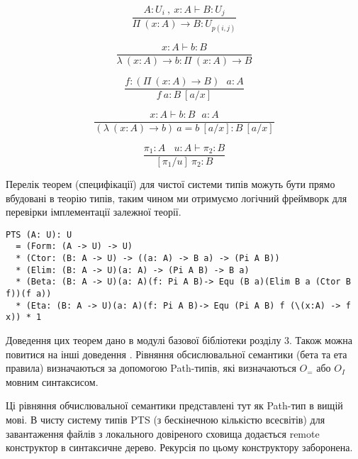 \begin{equation}
\tag{$\Pi$-formation}
\dfrac
{A:U_i\ ,\ x:A \vdash B : U_j}
{\Pi\ (x:A) \rightarrow B : U_{p(i,j)}}
\end{equation}

\begin{equation}
\tag{$\lambda$-intro}
\dfrac
{x:A \vdash b : B}
{\lambda\ (x:A) \rightarrow b : \Pi\ (x: A) \rightarrow B }
\end{equation}

\begin{equation}
\tag{$App$-elimination}
\dfrac
{f: (\Pi\ (x:A) \rightarrow B)\ \ \ a: A}
{f\ a : B\ [a/x]}
\end{equation}

\begin{equation}
\tag{$\beta$-computation}
\dfrac
{x:A \vdash b: B\ \ \ a:A}
{(\lambda\ (x:A) \rightarrow b)\ a = b\ [a/x] : B\ [a/x]}
\end{equation}

\begin{equation}
\tag{subst}
\dfrac
{\pi_1 : A\ \ \ \ u:A \vdash \pi_2 : B}
{[\pi_1/u]\ \pi_2 : B}
\end{equation}

Перелік теорем (специфікації) для чистої системи типів можуть бути
прямо вбудовані в теорію типів, таким чином ми отримуємо логічний фреймворк
для перевірки імплементації залежної теорії.

\begin{lstlisting}[mathescape=true]
PTS (A: U): U
  = (Form: (A -> U) -> U)
  * (Ctor: (B: A -> U) -> ((a: A) -> B a) -> (Pi A B))
  * (Elim: (B: A -> U)(a: A) -> (Pi A B) -> B a)
  * (Beta: (B: A -> U)(a: A)(f: Pi A B)-> Equ (B a)(Elim B a (Ctor B f))(f a))
  * (Eta: (B: A -> U)(a: A)(f: Pi A B)-> Equ (Pi A B) f (\(x:A) -> f x)) * 1
\end{lstlisting}

Доведення цих теорем дано в модулі базової бібліотеки розділу 3.
Також можна повитися на інші доведення \cite{Henk93}.
Рівняння обсислювальної семантики (бета та ета правила) визначаються
за допомогою Path-типів, які визначаються $O_=$ або $O_I$ мовним синтаксисом.

Ці рівняння обчислювальної семантики представлені тут як Path-тип в вищій мові.
В чисту систему типів PTS (з бескінечною кількістю всесвітів)
для завантаження файлів з локального довіреного сховища додається
remote конструктор в синтаксичне дерево. Рекурсія по цьому конструктору заборонена.

